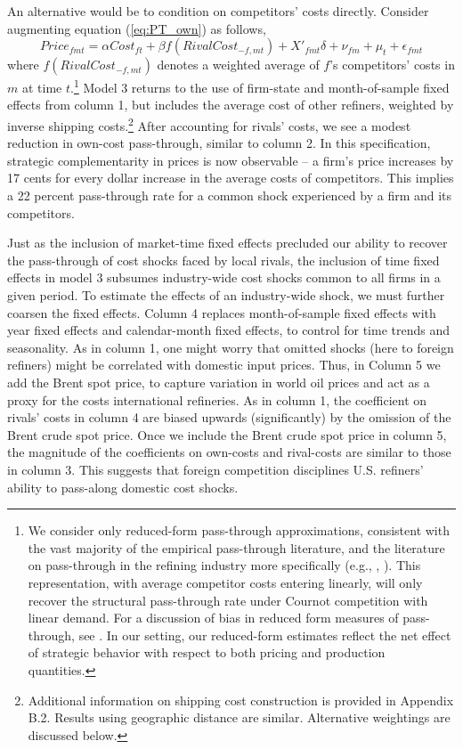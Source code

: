 \documentclass[12pt]{article}
\begin{document}
An alternative would be to condition on competitors' costs directly.  Consider augmenting equation (\ref{eq:PT_own}) as follows,
\begin{equation}
Price_{fmt}=\alpha Cost_{ft}+\beta f(RivalCost_{-f,mt})+X'_{fmt}\delta+ \nu_{fm} + \mu_t +\epsilon_{fmt}\label{eq:PT_rival}
\end{equation}
where $f(RivalCost_{-f,mt})$ denotes a weighted average of $f$'s competitors' costs in $m$ at time $t$.\footnote{We consider only reduced-form pass-through approximations, consistent with the  vast majority of the empirical pass-through literature, and the literature on pass-through in the refining industry more specifically (e.g., \citet{hastings_market_2005}, \citet{brown_reformulating_2008}).  This representation, with average competitor costs entering linearly, will only recover the structural pass-through rate under Cournot competition with linear demand. For a discussion of bias in reduced form measures of pass-through, see \citet{MacKay2014-cc}.  In our setting, our reduced-form estimates reflect the net effect of strategic behavior with respect to both pricing and production quantities.} Model 3 returns to the use of firm-state and month-of-sample fixed effects from column 1, but includes the average cost of other refiners, weighted by inverse shipping costs.\footnote{Additional information on shipping cost construction is provided in Appendix B.2. Results using geographic distance are similar. Alternative weightings are discussed below.} After accounting for rivals' costs, we see a modest reduction in own-cost pass-through, similar to column 2. In this specification, strategic complementarity in prices is now observable -- a firm's price increases by 17 cents for every dollar increase in the average costs of competitors.  This implies a 22 percent pass-through rate for a common shock experienced by a firm and its competitors.

Just as the inclusion of market-time fixed effects precluded our ability to recover the pass-through of cost shocks faced by local rivals, the inclusion of time fixed effects in model 3 subsumes industry-wide cost shocks common to all firms in a given period. To estimate the effects of an industry-wide shock, we must further coarsen the fixed effects. Column 4 replaces month-of-sample fixed effects with year fixed effects and calendar-month fixed effects, to control for time trends and seasonality. As in column 1, one might worry that omitted shocks (here to foreign refiners) might be correlated with domestic input prices.  Thus, in Column 5 we add the Brent spot price, to capture variation in world oil prices and act as a proxy for the costs international refineries.  As in column 1, the coefficient on rivals' costs in column 4 are biased upwards (significantly) by the omission of the Brent crude spot price.  Once we include the Brent crude spot price in column 5, the magnitude of the coefficients on own-costs and rival-costs are similar to those in column 3.  This suggests that foreign competition disciplines U.S. refiners' ability to pass-along domestic cost shocks.
\end{document}
